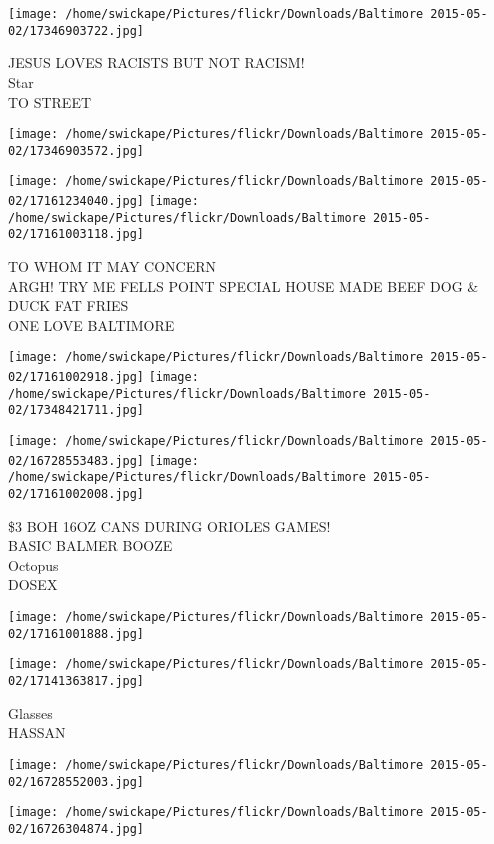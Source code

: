 \documentclass[10pt,letterpaper]{article}
\begin{document}
\texttt{[image: /home/swickape/Pictures/flickr/Downloads/Baltimore 2015-05-02/17346903722.jpg]}

JESUS LOVES RACISTS BUT NOT RACISM!\\
Star\\
TO STREET
\pagebreak

\texttt{[image: /home/swickape/Pictures/flickr/Downloads/Baltimore 2015-05-02/17346903572.jpg]}

\vspace{0.25in}
\texttt{[image: /home/swickape/Pictures/flickr/Downloads/Baltimore 2015-05-02/17161234040.jpg]}
\texttt{[image: /home/swickape/Pictures/flickr/Downloads/Baltimore 2015-05-02/17161003118.jpg]}

TO WHOM IT MAY CONCERN\\
ARGH!  TRY ME FELLS POINT SPECIAL HOUSE MADE BEEF DOG \& DUCK FAT FRIES\\
ONE LOVE BALTIMORE
\pagebreak

\texttt{[image: /home/swickape/Pictures/flickr/Downloads/Baltimore 2015-05-02/17161002918.jpg]}
\texttt{[image: /home/swickape/Pictures/flickr/Downloads/Baltimore 2015-05-02/17348421711.jpg]}

\texttt{[image: /home/swickape/Pictures/flickr/Downloads/Baltimore 2015-05-02/16728553483.jpg]}
\texttt{[image: /home/swickape/Pictures/flickr/Downloads/Baltimore 2015-05-02/17161002008.jpg]}

\$3 BOH 16OZ CANS DURING ORIOLES GAMES!\\
BASIC BALMER BOOZE\\
Octopus\\
DOSEX
\pagebreak

\texttt{[image: /home/swickape/Pictures/flickr/Downloads/Baltimore 2015-05-02/17161001888.jpg]}

\vspace{0.25in}
\texttt{[image: /home/swickape/Pictures/flickr/Downloads/Baltimore 2015-05-02/17141363817.jpg]}

Glasses\\
HASSAN
\pagebreak

\texttt{[image: /home/swickape/Pictures/flickr/Downloads/Baltimore 2015-05-02/16728552003.jpg]}

\vspace{0.25in}
\texttt{[image: /home/swickape/Pictures/flickr/Downloads/Baltimore 2015-05-02/16726304874.jpg]}
\end{document}
